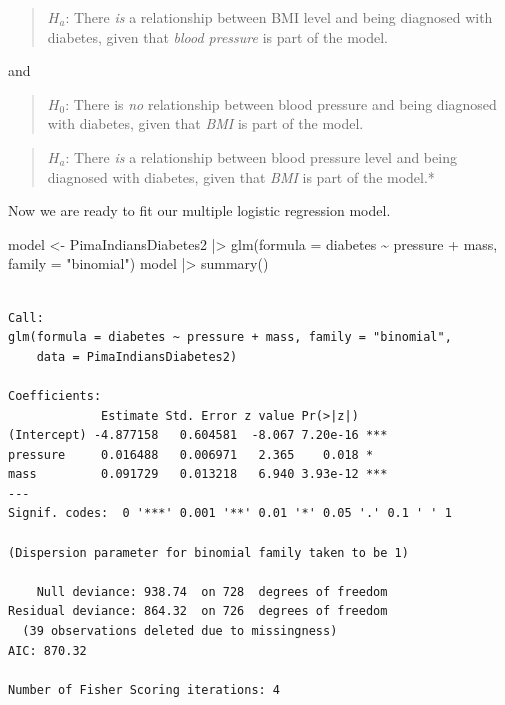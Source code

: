 \documentclass[
  letterpaper,
  DIV=11,
  numbers=noendperiod]{scrreprt}
\newenvironment{Shaded}{\begin{snugshade}}{\end{snugshade}}
\newcommand{\AttributeTok}[1]{\textcolor[rgb]{0.40,0.45,0.13}{#1}}
\newcommand{\FunctionTok}[1]{\textcolor[rgb]{0.28,0.35,0.67}{#1}}
\newcommand{\NormalTok}[1]{\textcolor[rgb]{0.00,0.23,0.31}{#1}}
\newcommand{\OtherTok}[1]{\textcolor[rgb]{0.00,0.23,0.31}{#1}}
\newcommand{\SpecialCharTok}[1]{\textcolor[rgb]{0.37,0.37,0.37}{#1}}
\newcommand{\StringTok}[1]{\textcolor[rgb]{0.13,0.47,0.30}{#1}}
\begin{document}
\begin{quote}
\textbf{\(H_a\)}: There \emph{is} a relationship between BMI level and
being diagnosed with diabetes, given that \emph{blood pressure} is part
of the model.
\end{quote}

and

\begin{quote}
\textbf{\(H_0\)}: There is \emph{no} relationship between blood pressure
and being diagnosed with diabetes, given that \emph{BMI} is part of the
model.
\end{quote}

\begin{quote}
\textbf{\(H_a\)}: There \emph{is} a relationship between blood pressure
level and being diagnosed with diabetes, given that \emph{BMI} is part
of the model.*
\end{quote}

Now we are ready to fit our multiple logistic regression model.

\begin{Shaded}
\begin{Highlighting}[]
\NormalTok{model }\OtherTok{\textless{}{-}}\NormalTok{ PimaIndiansDiabetes2 }\SpecialCharTok{|\textgreater{}} 
  \FunctionTok{glm}\NormalTok{(}\AttributeTok{formula =}\NormalTok{ diabetes }\SpecialCharTok{\textasciitilde{}}\NormalTok{ pressure }\SpecialCharTok{+}\NormalTok{ mass, }\AttributeTok{family =} \StringTok{"binomial"}\NormalTok{)}
\NormalTok{model }\SpecialCharTok{|\textgreater{}} \FunctionTok{summary}\NormalTok{()}
\end{Highlighting}
\end{Shaded}

\begin{verbatim}

Call:
glm(formula = diabetes ~ pressure + mass, family = "binomial", 
    data = PimaIndiansDiabetes2)

Coefficients:
             Estimate Std. Error z value Pr(>|z|)    
(Intercept) -4.877158   0.604581  -8.067 7.20e-16 ***
pressure     0.016488   0.006971   2.365    0.018 *  
mass         0.091729   0.013218   6.940 3.93e-12 ***
---
Signif. codes:  0 '***' 0.001 '**' 0.01 '*' 0.05 '.' 0.1 ' ' 1

(Dispersion parameter for binomial family taken to be 1)

    Null deviance: 938.74  on 728  degrees of freedom
Residual deviance: 864.32  on 726  degrees of freedom
  (39 observations deleted due to missingness)
AIC: 870.32

Number of Fisher Scoring iterations: 4
\end{verbatim}
\end{document}
